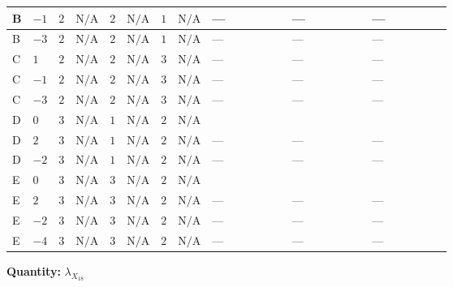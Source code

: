 \documentclass[8pt]{article}
\begin{document}
\begin{landscape}
\begin{longtable}{@{}llcccccc >{\raggedright\arraybackslash}p{0.21\linewidth} >{\raggedright\arraybackslash}p{0.21\linewidth} >{\raggedright\arraybackslash}p{0.21\linewidth}@{}}
\midrule
B & $-1$ & $2$ & $\text{N/A}$ & $2$ & $\text{N/A}$ & $1$ & $\text{N/A}$ & --- & --- & --- \\
\midrule
B & $-3$ & $2$ & $\text{N/A}$ & $2$ & $\text{N/A}$ & $1$ & $\text{N/A}$ & --- & --- & --- \\
\midrule
C & $1$ & $2$ & $\text{N/A}$ & $2$ & $\text{N/A}$ & $3$ & $\text{N/A}$ & --- & --- & --- \\
\midrule
C & $-1$ & $2$ & $\text{N/A}$ & $2$ & $\text{N/A}$ & $3$ & $\text{N/A}$ & --- & --- & --- \\
\midrule
C & $-3$ & $2$ & $\text{N/A}$ & $2$ & $\text{N/A}$ & $3$ & $\text{N/A}$ & --- & --- & --- \\
\midrule
D & $0$ & $3$ & $\text{N/A}$ & $1$ & $\text{N/A}$ & $2$ & $\text{N/A}$ & \scriptsize\adjustbox{max width=\linewidth}{$\begin{gathered} -\frac{33 {g_2}^2 {\lambda_{X_{18}}}}{2}\end{gathered}$} & \scriptsize\adjustbox{max width=\linewidth}{$\begin{gathered} -\frac{3 {g_1}^2 {\lambda_{X_{18}}}}{2}\end{gathered}$} & \scriptsize\adjustbox{max width=\linewidth}{$\begin{gathered} +6 {\lambda_1} {\lambda_{X_{18}}}\end{gathered}$} \\
\midrule
D & $2$ & $3$ & $\text{N/A}$ & $1$ & $\text{N/A}$ & $2$ & $\text{N/A}$ & --- & --- & --- \\
\midrule
D & $-2$ & $3$ & $\text{N/A}$ & $1$ & $\text{N/A}$ & $2$ & $\text{N/A}$ & --- & --- & --- \\
\midrule
E & $0$ & $3$ & $\text{N/A}$ & $3$ & $\text{N/A}$ & $2$ & $\text{N/A}$ & \scriptsize\adjustbox{max width=\linewidth}{$\begin{gathered} -\frac{33 {g_2}^2 {\lambda_{X_{18}}}}{2}\end{gathered}$} & \scriptsize\adjustbox{max width=\linewidth}{$\begin{gathered} -\frac{3 {g_1}^2 {\lambda_{X_{18}}}}{2}\end{gathered}$} & \scriptsize\adjustbox{max width=\linewidth}{$\begin{gathered} +6 {\lambda_1} {\lambda_{X_{18}}}\end{gathered}$} \\
\midrule
E & $2$ & $3$ & $\text{N/A}$ & $3$ & $\text{N/A}$ & $2$ & $\text{N/A}$ & --- & --- & --- \\
\midrule
E & $-2$ & $3$ & $\text{N/A}$ & $3$ & $\text{N/A}$ & $2$ & $\text{N/A}$ & --- & --- & --- \\
\midrule
E & $-4$ & $3$ & $\text{N/A}$ & $3$ & $\text{N/A}$ & $2$ & $\text{N/A}$ & --- & --- & --- \\
\midrule
\bottomrule
\end{longtable}
\clearpage
\noindent\textbf{Quantity: }${\lambda_{X_{18}}}$\par\smallskip

\end{landscape}
\end{document}
